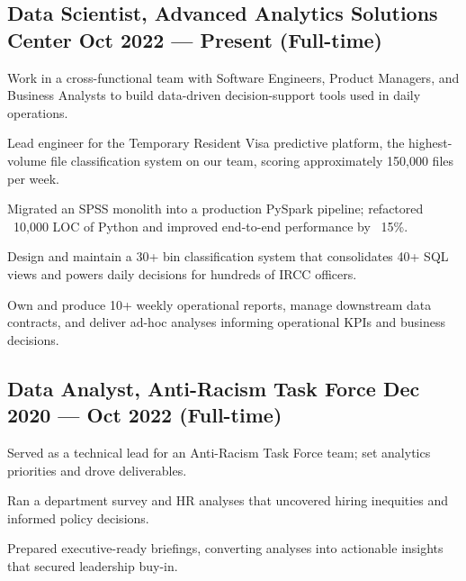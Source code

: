 \subsection{{Data Scientist, Advanced Analytics Solutions Center \hfill Oct 2022 --- Present (Full-time)}}
\begin{zitemize}
    \setlength\itemsep{0.3em}
    \item Work in a cross-functional team with Software Engineers, Product Managers, and Business Analysts to build data-driven decision-support tools used in daily operations.
    \item Lead engineer for the Temporary Resident Visa predictive platform, the highest-volume file classification system on our team, scoring approximately 150{,}000 files per week.
    \item Migrated an SPSS monolith into a production PySpark pipeline; refactored ~10{,}000 LOC of Python and improved end-to-end performance by ~15\%.
    \item Design and maintain a 30+ bin classification system that consolidates 40+ SQL views and powers daily decisions for hundreds of IRCC officers.
    \item Own and produce 10+ weekly operational reports, manage downstream data contracts, and deliver ad-hoc analyses informing operational KPIs and business decisions.
\end{zitemize}
\vspace{0.5em}

\subsection{{Data Analyst, Anti-Racism Task Force \hfill Dec 2020 --- Oct 2022 (Full-time)}}
\begin{zitemize}
    \setlength\itemsep{0.3em}
    \item Served as a technical lead for an Anti-Racism Task Force team; set analytics priorities and drove deliverables.
    \item Ran a department survey and HR analyses that uncovered hiring inequities and informed policy decisions.
    \item Prepared executive-ready briefings, converting analyses into actionable insights that secured leadership buy-in.
\end{zitemize}


